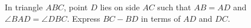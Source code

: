 In triangle $ABC$, point $D$ lies on side $AC$ such that $AB=AD$ and $\angle BAD=\angle DBC$. Express $BC-BD$ in terms of $AD$ and $DC$.
